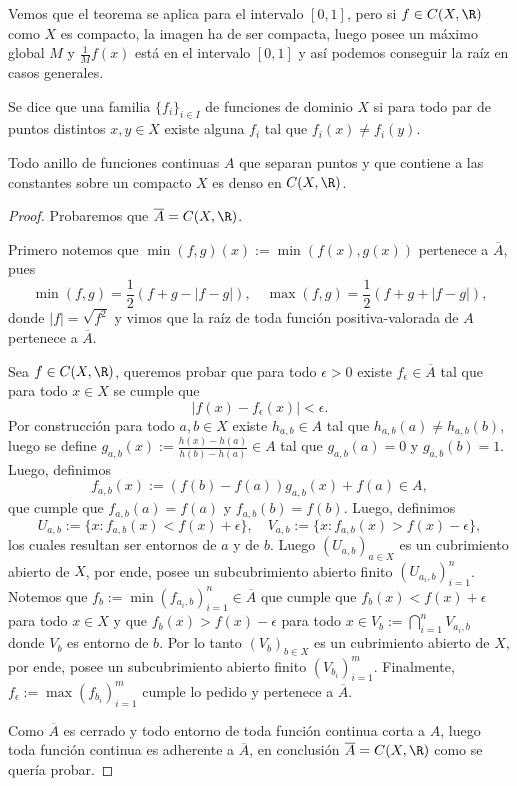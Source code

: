 \documentclass[topologia-analisis.tex]{subfiles}
\begin{document}
Vemos que el teorema se aplica para el intervalo $[0,1]$, pero si $f\in C(X, \R)$ como $X$ es compacto, la imagen ha de ser compacta, luego posee un máximo global $M$ y $\frac 1M f(x)$ está en el intervalo $[0,1]$ y así podemos conseguir la raíz en casos generales.

\begin{mydef}
	Se dice que una familia $\{f_i\}_{i\in I}$ de funciones de dominio $X$  si para todo par de puntos distintos $x,y\in X$ existe alguna $f_i$ tal que $f_i(x) \ne f_i(y)$.
\end{mydef}

\begin{thmi}
	Todo anillo de funciones continuas $A$ que separan puntos y que contiene a las constantes sobre un compacto $X$ es denso en $C(X, \R)$.
\end{thmi}
\begin{proof}
	Probaremos que $\overline{A} = C(X, \R)$.
	\par
	Primero notemos que $\min(f, g)(x) := \min(f(x), g(x))$ pertenece a $\overline{A}$, pues
	$$ \min(f,g) = \frac{1}{2}(f+g-|f-g|),\quad \max(f,g) = \frac{1}{2}(f+g+|f-g|), $$
	donde $|f| = \sqrt{f^2}$ y vimos que la raíz de toda función positiva-valorada de $A$ pertenece a $\overline{A}$.
	\par
	Sea $f\in C(X, \R)$, queremos probar que para todo $\epsilon > 0$ existe $f_\epsilon \in \overline{A}$ tal que para todo $x\in X$ se cumple que
	$$ |f(x) - f_\epsilon(x)| < \epsilon. $$
	Por construcción para todo $a,b\in X$ existe $h_{a,b} \in A$ tal que $h_{a,b}(a) \ne h_{a,b}(b)$, luego se define $g_{a,b}(x) := \frac{h(x) - h(a)}{h(b) - h(a)} \in A$ tal que $g_{a,b}(a) = 0$ y $g_{a,b}(b) = 1$. Luego, definimos
	$$ f_{a,b}(x) := (f(b) - f(a))g_{a,b}(x) + f(a) \in A, $$
	que cumple que $f_{a,b}(a) = f(a)$ y $f_{a,b}(b) = f(b)$. Luego, definimos
	$$ U_{a,b} := \{x: f_{a,b}(x) < f(x) + \epsilon\},\quad V_{a,b} := \{x: f_{a,b}(x) > f(x) - \epsilon\}, $$
	los cuales resultan ser entornos de $a$ y de $b$.
	Luego $(U_{a,b})_{a\in X}$ es un cubrimiento abierto de $X$, por ende, posee un subcubrimiento abierto finito $(U_{a_i,b})_{i=1}^n$.
	Notemos que $f_b := \min(f_{a_i,b})_{i=1}^n \in \overline{A}$ que cumple que $ f_b(x) < f(x) + \epsilon $ para todo $x\in X$ y que $f_b(x) > f(x) - \epsilon$ para todo $x \in V_b := \bigcap_{i=1}^n V_{a_i, b}$ donde $V_b$ es entorno de $b$.
	Por lo tanto $(V_b)_{b\in X}$ es un cubrimiento abierto de $X$, por ende, posee un subcubrimiento abierto finito $(V_{b_i})_{i=1}^m$.
	Finalmente, $f_\epsilon := \max(f_{b_i})_{i=1}^m$ cumple lo pedido y pertenece a $\overline{A}$.
	\par
	Como $\overline{A}$ es cerrado y todo entorno de toda función continua corta a $A$, luego toda función continua es adherente a $\overline{A}$, en conclusión $\overline{A} = C(X,\R)$ como se quería probar.
\end{proof}
\end{document}
